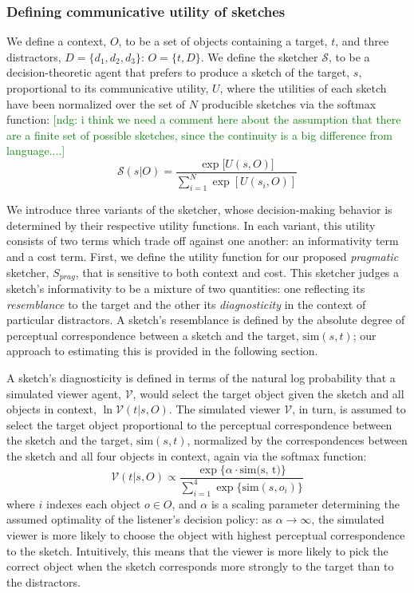 \documentclass[9pt,twocolumn,twoside]{pnas-new}
\newcommand{\ndg}[1]{\textcolor{Green}{[ndg: #1]}}
\begin{document}
\subsubsection*{Defining communicative utility of sketches}

We define a context, $O$, to be a set of objects containing a target, $t$, and three distractors, $D=\{d_1,d_2,d_3\}$: $O = \{t,D\}$.
We define the sketcher $\mathcal{S}$, to be a decision-theoretic agent that prefers to produce a sketch of the target, $s$, proportional to its communicative utility, $U$, where the utilities of each sketch have been normalized over the set of $N$ producible sketches via the softmax function: \ndg{i think we need a comment here about the assumption that there are a finite set of possible sketches, since the continuity is a big difference from language....}
\begin{equation} \label{sketcher_distribution}
\mathcal{S}(s|O) = \frac {\exp [{U(s,O)]}} {\sum_{i=1}^{N} {\exp [U(s_i,O)]}}
\end{equation}

We introduce three variants of the sketcher, whose decision-making behavior is determined by their respective utility functions. 
In each variant, this utility consists of two terms which trade off against one another: an informativity term and a cost term. 
First, we define the utility function for our proposed \textit{pragmatic} sketcher, $S_{prag}$, that is sensitive to both context and cost. 
This sketcher judges a sketch's informativity to be a mixture of two quantities: one reflecting its \textit{resemblance} to the target and the other its \textit{diagnosticity} in the context of particular distractors. 
A sketch's resemblance is defined by the absolute degree of perceptual correspondence between a sketch and the target, $\textrm{sim}(s,t)$; our approach to estimating this is provided in the following section. 

A sketch's diagnosticity is defined in terms of the natural log probability that a simulated viewer agent, $\mathcal{V}$, would select the target object given the sketch and all objects in context, $\ln \mathcal{V}(t|s,O)$. 
The simulated viewer $\mathcal{V}$, in turn, is assumed to select the target object proportional to the perceptual correspondence between the sketch and the target, $\textrm{sim}(s,t)$, normalized by the correspondences between the sketch and all four objects in context, again via the softmax function:
\begin{equation} \label{literal_viewer_score}
\mathcal{V}(t|s,O) \propto \frac {\exp\{\alpha \cdot \textrm{sim(s, t)}\}} {\sum_{i=1}^{4} \exp\{\textrm{sim}(s,o_i)\}}
\end{equation}
where $i$ indexes each object $o\in O$, and $\alpha$ is a scaling parameter determining the assumed optimality of the listener's decision policy: as $\alpha \rightarrow \infty$, the simulated viewer is more likely to choose the object with highest perceptual correspondence to the sketch. 
Intuitively, this means that the viewer is more likely to pick the correct object when the sketch corresponds more strongly to the target than to the distractors. 
\end{document}
